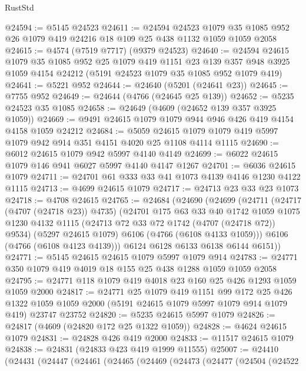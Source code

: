 \begin{lexlean}{RustStd}
\begin{coremodule}
@24594 := @5145 @24523
@24611 := @24594
    @24523
    @1079
    @35
    @1085
    @952
    @26
    @1079
    @419
    @24216
    @18
    @109
    @25
    @438
    @1132
    @1059
    @1059
    @2058
@24615 := @4574 (@7519 @7717) (@9379 @24523)
@24640 := @24594
    @24615
    @1079
    @35
    @1085
    @952
    @25
    @1079
    @419
    @1151
    @23
    @139
    @357
    @948
    @3925
    @1059
    @4154
    @24212
    (@5191 @24523 @1079 @35 @1085 @952 @1079 @419)
@24641 := @5221 @952
@24644 := @24640 (@5201 (@24641 @23))
@24645 := @7755 @952
@24649 := @24644 (@4766 (@24645 @25 @139))
@24652 := @5235 @24523 @35 @1085
@24658 := @24649 (@4609 (@24652 @139 @357 @3925 @1059))
@24669 := @9491 @24615 @1079 @1079 @944 @946 @426 @419 @4154 @4158 @1059 @24212
@24684 := @5059 @24615 @1079 @1079 @419 @5997 @1079 @942 @914 @351 @4151 @4020 @25 @1108 @4114 @1115
@24690 := @6012 @24615 @1079 @942 @5997 @4140 @4149
@24699 := @6022 @24615 @1079 @146 @941 @6027 @5997 @4140 @4147 @1267
@24701 := @6036 @24615 @1079
@24711 := @24701 @61 @333 @33 @41 @1073 @4139 @4146 @1230 @4122 @1115
@24713 := @4699 @24615 @1079
@24717 := @24713 @23 @33 @23 @1073
@24718 := @4708 @24615
@24765 := @24684
    (@24690
      (@24699
        (@24711
          (@24717 (@4707 (@24718 @23)) @4735)
          (@24701
            @175
            @63
            @33
            @40
            @1742
            @1059
            @1075
            @1230
            @4132
            @1115
            (@24713 @72 @33 @72 @1742 (@4707 (@24718 @72)) @9534)
            (@5297 @24615 @1079)
            @6106
            (@4766 (@6108 @4133 @1059)))
          @6106
          (@4766 (@6108 @4123 @4139)))
        @6124
        @6128
        @6133
        @6138
        @6144
        @6151))
@24771 := @5145 @24615 @24615 @1079 @5997 @1079 @914
@24783 := @24771 @350 @1079 @419 @4019 @18 @155 @25 @438 @1288 @1059 @1059 @2058
@24795 := @24771 @118 @1079 @419 @4018 @23 @160 @25 @426 @1293 @1059 @1059 @2000
@24817 := @24771
    @25
    @1079
    @419
    @1151
    @99
    @172
    @25
    @426
    @1322
    @1059
    @1059
    @2000
    (@5191 @24615 @1079 @5997 @1079 @914 @1079 @419)
    @23747
    @23752
@24820 := @5235 @24615 @5997 @1079
@24826 := @24817 (@4609 (@24820 @172 @25 @1322 @1059))
@24828 := @4624 @24615 @1079
@24831 := @24828 @426 @419 @2000
@24833 := @11517 @24615 @1079
@24838 := @24831 (@24833 @423 @419 @1999 @11555)
@25007 := @24410
    (@24431
      (@24447
        (@24461
          (@24465
            (@24469
              (@24473
                (@24477
                  (@24504
                    (@24522

\end{coremodule}
\end{lexlean}
